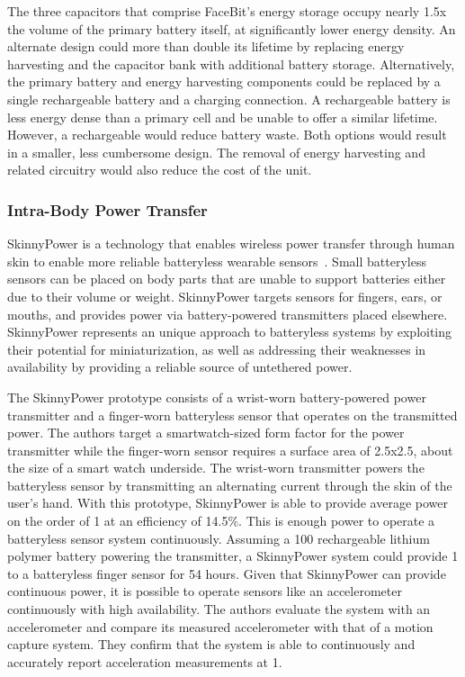 The three capacitors that comprise FaceBit's energy storage occupy nearly 1.5x the volume of the primary battery itself, at significantly lower energy density.
An alternate design could more than double its lifetime by replacing energy harvesting and the capacitor bank with additional battery storage.
Alternatively, the primary battery and energy harvesting components could be replaced by a single rechargeable battery and a charging connection.
A rechargeable battery is less energy dense than a primary cell and be unable to offer a similar lifetime.
However, a rechargeable would reduce battery waste.
Both options would result in a smaller, less cumbersome design. The removal of energy harvesting and related circuitry would also reduce the cost of the unit.

\subsubsection{Intra-Body Power Transfer}
SkinnyPower is a technology that enables wireless power transfer through human skin to enable more reliable batteryless wearable sensors~\cite{shukla2019skinnypower}.
Small batteryless sensors can be placed on body parts that are unable to support batteries either due to their volume or weight.
SkinnyPower targets sensors for fingers, ears, or mouths, and provides power via battery-powered transmitters placed elsewhere.
SkinnyPower represents an unique approach to batteryless systems by exploiting their potential for miniaturization, as well as addressing their weaknesses in availability by providing a reliable source of untethered power.

The SkinnyPower prototype consists of a wrist-worn battery-powered power transmitter
and a finger-worn batteryless sensor that operates on the transmitted power.
The authors target a smartwatch-sized form factor for the power transmitter while the finger-worn sensor requires a surface area of 2.5x2.5\ssi{\centi\meter\squared}, about the size of a smart watch underside. 
The wrist-worn transmitter powers the batteryless sensor by transmitting an alternating current through the skin of the user's hand.
With this prototype, SkinnyPower is able to provide average power on the order of 1\ssi{\milli\watt} at an efficiency of 14.5\%. This is enough power to operate a batteryless sensor system continuously.
Assuming a 100\ssi{\milli\Ah} rechargeable lithium polymer battery powering the transmitter, a SkinnyPower system could provide 1\ssi{\milli\watt} to a batteryless finger sensor for 54 hours.
Given that SkinnyPower can provide continuous power, it is possible to operate sensors like an accelerometer continuously with high availability. The authors evaluate the system with an accelerometer and compare its measured accelerometer with that of a motion capture system. They confirm that the system is able to continuously and accurately report acceleration measurements at 1\ssi{\hertz}.

